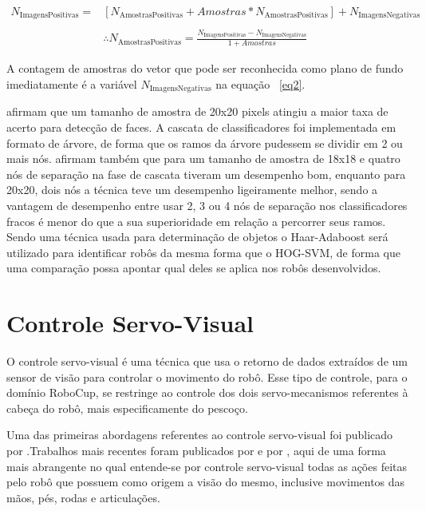 \begin{equation}
\label{eq2}
\begin{aligned}
N_{\text{ImagensPositivas}} = & [ N_{\text{AmostrasPositivas}} + Amostras * N_{\text{AmostrasPositivas}} ] + N_{\text{ImagensNegativas}} \\
			& \\
        		& \therefore  N_{\text{AmostrasPositivas}} = \frac { N_{\text{ImagensPositivas}} - N_{\text{ImagensNegativas}} } { 1 + Amostras} 
\end{aligned}
\end{equation}



A contagem de amostras do vetor que pode ser reconhecida como plano de fundo imediatamente é a variável \(N_{\text{ImagensNegativas}}\) na equação ~\ref{eq2}. 

 afirmam que um tamanho de amostra de 20x20 pixels atingiu a maior taxa de acerto para detecção de faces. A cascata de classificadores foi implementada em formato de árvore, de forma que os ramos da árvore pudessem se dividir em 2 ou mais nós.  afirmam também que para um tamanho de amostra de 18x18 e quatro nós de separação na fase de cascata tiveram um desempenho bom, enquanto para 20x20, dois nós a técnica teve um desempenho ligeiramente melhor, sendo a vantagem de desempenho entre usar 2, 3 ou 4 nós de separação nos classificadores fracos é menor do que a sua superioridade em relação a percorrer seus ramos. Sendo uma técnica usada para determinação de objetos o Haar-Adaboost será utilizado para identificar robôs da mesma forma que o HOG-SVM, de forma que uma comparação possa apontar qual deles se aplica nos robôs desenvolvidos.



\section{Controle Servo-Visual}

O controle servo-visual é uma técnica que usa o retorno de dados extraídos de um sensor de visão para controlar o movimento do robô. Esse tipo de controle, para o domínio RoboCup, se restringe ao controle dos dois servo-mecanismos referentes à cabeça do robô, mais especificamente do pescoço.

Uma das primeiras abordagens referentes ao controle servo-visual foi publicado por .Trabalhos mais recentes foram publicados por  e por , aqui de uma forma mais abrangente no qual entende-se por controle servo-visual todas as ações feitas pelo robô que possuem como origem a visão do mesmo, inclusive movimentos das mãos, pés, rodas e articulações.

